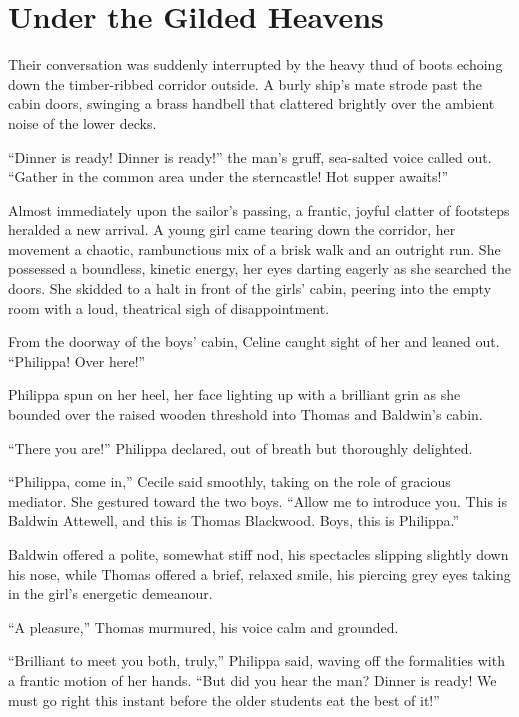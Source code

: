 \section*{Under the Gilded Heavens}

Their conversation was suddenly interrupted by the heavy thud of boots echoing down the timber-ribbed corridor outside. A burly ship's mate strode past the cabin doors, swinging a brass handbell that clattered brightly over the ambient noise of the lower decks.

\enquote{Dinner is ready! Dinner is ready!} the man's gruff, sea-salted voice called out. \enquote{Gather in the common area under the sterncastle! Hot supper awaits!}

Almost immediately upon the sailor's passing, a frantic, joyful clatter of footsteps heralded a new arrival. A young girl came tearing down the corridor, her movement a chaotic, rambunctious mix of a brisk walk and an outright run. She possessed a boundless, kinetic energy, her eyes darting eagerly as she searched the doors. She skidded to a halt in front of the girls' cabin, peering into the empty room with a loud, theatrical sigh of disappointment.

From the doorway of the boys' cabin, Celine caught sight of her and leaned out. \enquote{Philippa! Over here!}

Philippa spun on her heel, her face lighting up with a brilliant grin as she bounded over the raised wooden threshold into Thomas and Baldwin's cabin.

\enquote{There you are!} Philippa declared, out of breath but thoroughly delighted.

\enquote{Philippa, come in,} Cecile said smoothly, taking on the role of gracious mediator. She gestured toward the two boys. \enquote{Allow me to introduce you. This is Baldwin Attewell, and this is Thomas Blackwood. Boys, this is Philippa.}

Baldwin offered a polite, somewhat stiff nod, his spectacles slipping slightly down his nose, while Thomas offered a brief, relaxed smile, his piercing grey eyes taking in the girl's energetic demeanour.

\enquote{A pleasure,} Thomas murmured, his voice calm and grounded.

\enquote{Brilliant to meet you both, truly,} Philippa said, waving off the formalities with a frantic motion of her hands. \enquote{But did you hear the man? Dinner is ready! We must go right this instant before the older students eat the best of it!}

